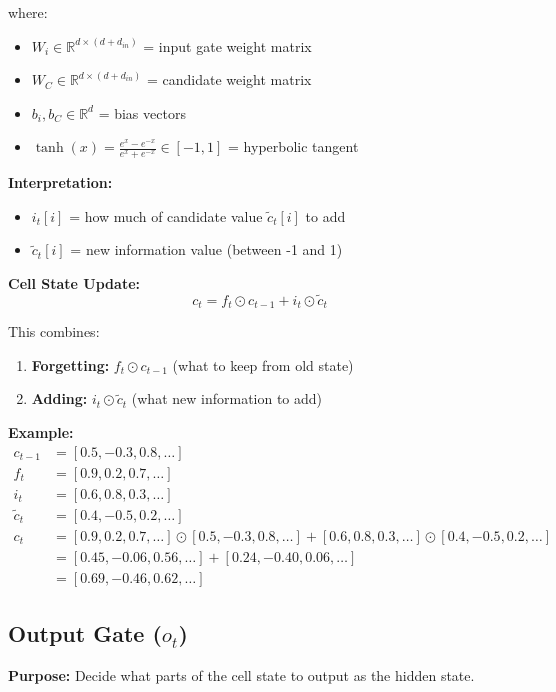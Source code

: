 \documentclass[12pt]{article}
\begin{document}
where:
\begin{itemize}
    \item $W_i \in \mathbb{R}^{d \times (d + d_{in})}$ = input gate weight matrix
    \item $W_C \in \mathbb{R}^{d \times (d + d_{in})}$ = candidate weight matrix
    \item $b_i, b_C \in \mathbb{R}^d$ = bias vectors
    \item $\tanh(x) = \frac{e^x - e^{-x}}{e^x + e^{-x}} \in [-1, 1]$ = hyperbolic tangent
\end{itemize}

\textbf{Interpretation:}
\begin{itemize}
    \item $i_t[i]$ = how much of candidate value $\tilde{c}_t[i]$ to add
    \item $\tilde{c}_t[i]$ = new information value (between -1 and 1)
\end{itemize}

\textbf{Cell State Update:}
\[
c_t = f_t \odot c_{t-1} + i_t \odot \tilde{c}_t
\]

This combines:
\begin{enumerate}
    \item \textbf{Forgetting:} $f_t \odot c_{t-1}$ (what to keep from old state)
    \item \textbf{Adding:} $i_t \odot \tilde{c}_t$ (what new information to add)
\end{enumerate}

\textbf{Example:}
\[
\begin{aligned}
c_{t-1} &= [0.5, -0.3, 0.8, \ldots] \\
f_t &= [0.9, 0.2, 0.7, \ldots] \\
i_t &= [0.6, 0.8, 0.3, \ldots] \\
\tilde{c}_t &= [0.4, -0.5, 0.2, \ldots] \\
c_t &= [0.9, 0.2, 0.7, \ldots] \odot [0.5, -0.3, 0.8, \ldots] + [0.6, 0.8, 0.3, \ldots] \odot [0.4, -0.5, 0.2, \ldots] \\
&= [0.45, -0.06, 0.56, \ldots] + [0.24, -0.40, 0.06, \ldots] \\
&= [0.69, -0.46, 0.62, \ldots]
\end{aligned}
\]

\subsection{Output Gate ($o_t$)}

\textbf{Purpose:} Decide what parts of the cell state to output as the hidden state.
\end{document}
